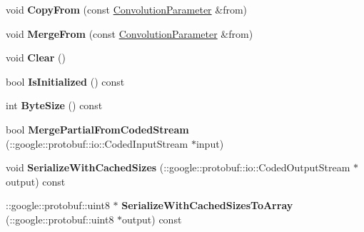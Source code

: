 \begin{DoxyCompactItemize}
\item 
\mbox{\label{classcaffe_1_1_convolution_parameter_a4c1c8309cbd239315ae2f607ea2b8c8f}} 
void {\bfseries Copy\+From} (const \mbox{\hyperlink{classcaffe_1_1_convolution_parameter}{Convolution\+Parameter}} \&from)
\item 
\mbox{\label{classcaffe_1_1_convolution_parameter_ab93dd0429b1b287ff4420308e18f5761}} 
void {\bfseries Merge\+From} (const \mbox{\hyperlink{classcaffe_1_1_convolution_parameter}{Convolution\+Parameter}} \&from)
\item 
\mbox{\label{classcaffe_1_1_convolution_parameter_a2be5a07a7a7765783d0ef0447b8ea672}} 
void {\bfseries Clear} ()
\item 
\mbox{\label{classcaffe_1_1_convolution_parameter_ae1e63fee9863283c0006420ab8a86734}} 
bool {\bfseries Is\+Initialized} () const
\item 
\mbox{\label{classcaffe_1_1_convolution_parameter_ad4db7c8366a55240422fa72116fcb703}} 
int {\bfseries Byte\+Size} () const
\item 
\mbox{\label{classcaffe_1_1_convolution_parameter_a11f817f016abe9d9bd930c81ddd0668d}} 
bool {\bfseries Merge\+Partial\+From\+Coded\+Stream} (\+::google\+::protobuf\+::io\+::\+Coded\+Input\+Stream $\ast$input)
\item 
\mbox{\label{classcaffe_1_1_convolution_parameter_a4505b133cae59bc8a6ac25eb366fbf42}} 
void {\bfseries Serialize\+With\+Cached\+Sizes} (\+::google\+::protobuf\+::io\+::\+Coded\+Output\+Stream $\ast$output) const
\item 
\mbox{\label{classcaffe_1_1_convolution_parameter_ad35a289a073147bb7c317a17a227e2c2}} 
\+::google\+::protobuf\+::uint8 $\ast$ {\bfseries Serialize\+With\+Cached\+Sizes\+To\+Array} (\+::google\+::protobuf\+::uint8 $\ast$output) const
\item 
\mbox{\label{classcaffe_1_1_convolution_parameter_a4d9532645395d201f77eeb6663a3ff5d}} 

\end{DoxyCompactItemize}
